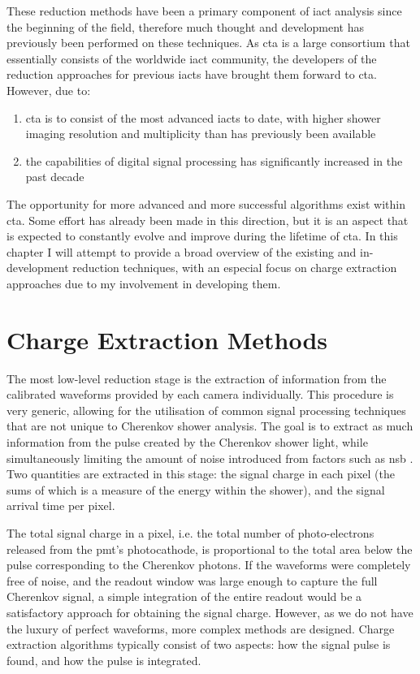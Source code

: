 These reduction methods have been a primary component of \gls{iact} analysis since the beginning of the field, therefore much thought and development has previously been performed on these techniques. As \gls{cta} is a large consortium that essentially consists of the worldwide \gls{iact} community, the developers of the reduction approaches for previous \glspl{iact} have brought them forward to \gls{cta}. However, due to:
\begin{enumerate}[label=(\alph*)]
	\item \gls{cta} is to consist of the most advanced \glspl{iact} to date, with higher shower imaging resolution and multiplicity than has previously been available
	\item the capabilities of digital signal processing has significantly increased in the past decade
\end{enumerate}
The opportunity for more advanced and more successful algorithms exist within \gls{cta}. Some effort has already been made in this direction, but it is an aspect that is expected to constantly evolve and improve during the lifetime of \gls{cta}. In this chapter I will attempt to provide a broad overview of the existing and in-development reduction techniques, with an especial focus on charge extraction approaches due to my involvement in developing them. 

\section{Charge Extraction Methods}

The most low-level reduction stage is the extraction of information from the calibrated waveforms provided by each camera individually. This procedure is very generic, allowing for the utilisation of common signal processing techniques that are not unique to Cherenkov shower analysis. The goal is to extract as much information from the pulse created by the Cherenkov shower light, while simultaneously limiting the amount of noise introduced from factors such as \gls{nsb} . Two quantities are extracted in this stage: the signal charge in each pixel (the sums of which is a measure of the energy within the shower), and the signal arrival time per pixel. 

The total signal charge in a pixel, i.e. the total number of photo-electrons released from the \gls{pmt}'s photocathode, is proportional to the total area below the pulse corresponding to the Cherenkov photons. If the waveforms were completely free of noise, and the readout window was large enough to capture the full Cherenkov signal, a simple integration of the entire readout would be a satisfactory approach for obtaining the signal charge. However, as we do not have the luxury of perfect waveforms, more complex methods are designed. Charge extraction algorithms typically consist of two aspects: how the signal pulse is found, and how the pulse is integrated.

